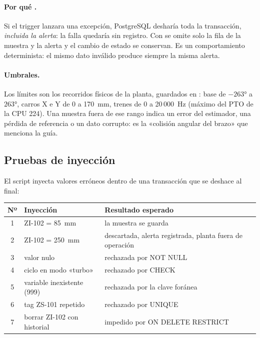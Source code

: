 \documentclass[a4paper,11pt]{article}
\begin{document}
\paragraph{Por qué .} Si el trigger lanzara una excepción, PostgreSQL desharía toda la transacción, \emph{incluida la alerta}: la falla quedaría sin registro. Con  se omite solo la fila de la muestra y la alerta y el cambio de estado se conservan. Es un comportamiento determinista: el mismo dato inválido produce siempre la misma alerta.

\paragraph{Umbrales.} Los límites son los recorridos físicos de la planta, guardados en : base de $-263°$ a $263°$, carros X e Y de 0 a 170~mm, trenes de 0 a 20\,000~Hz (máximo del PTO de la CPU 224). Una muestra fuera de ese rango indica un error del estimador, una pérdida de referencia o un dato corrupto: es la «colisión angular del brazo» que menciona la guía.

\subsection{Pruebas de inyección}
El script  inyecta valores erróneos dentro de una transacción que se deshace al final:
\begin{center}\small
\begin{tabularx}{\linewidth}{c >{\raggedright}X >{\raggedright\arraybackslash}p{5.6cm}}
\toprule
\textbf{Nº} & \textbf{Inyección} & \textbf{Resultado esperado}\\
\midrule
1 & ZI-102 = 85~mm & la muestra se guarda\\
2 & ZI-102 = 250~mm & descartada, alerta registrada, planta fuera de operación\\
3 & valor nulo & rechazada por NOT NULL\\
4 & ciclo en modo «turbo» & rechazado por CHECK\\
5 & variable inexistente (999) & rechazada por la clave foránea\\
6 & tag ZS-101 repetido & rechazado por UNIQUE\\
7 & borrar ZI-102 con historial & impedido por ON DELETE RESTRICT\\
\bottomrule
\end{tabularx}
\end{center}
\end{document}
